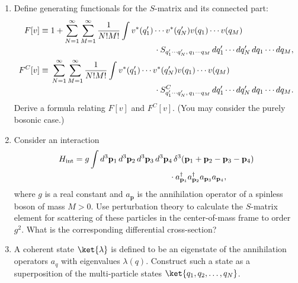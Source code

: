 

\begin{enumerate}
\item Define generating functionals for the $S$-matrix and its connected part:
\begin{align*}
  F[v] \equiv {}& 1
    + \sum_{N=1}^{\infty}\sum_{M=1}^{\infty}\frac{1}{N!M!}
      \int v^*(q'_1)\cdots v^*(q'_N)v(q_1)\cdots v(q_M)
      \\[-2pt]
    &\hspace{44mm}{}
      \cdot S_{q'_1\cdots q'_N,\,q_1\cdots q_M}
      \,dq'_1\cdots dq'_N\,dq_1\cdots dq_M, \\
  F^{C}[v] \equiv {}&
    \sum_{N=1}^{\infty}\sum_{M=1}^{\infty}\frac{1}{N!M!}
      \int v^*(q'_1)\cdots v^*(q'_N)v(q_1)\cdots v(q_M)
      \\[-2pt]
    &\hspace{44mm}{}
      \cdot S^{C}_{q'_1\cdots q'_N,\,q_1\cdots q_M}
      \,dq'_1\cdots dq'_N\,dq_1\cdots dq_M.
\end{align*}
Derive a formula relating $F[v]$ and $F^{C}[v]$. (You may consider the
purely bosonic case.)

\item Consider an interaction
\begin{align*}
  H_{\mathrm{int}} ={}& g\int d^3\mathbf{p}_1\,d^3\mathbf{p}_2\,
    d^3\mathbf{p}_3\,d^3\mathbf{p}_4\,
    \delta^3(\mathbf{p}_1+\mathbf{p}_2-\mathbf{p}_3-\mathbf{p}_4)
    \\
    &\hspace{36mm}{}
    \cdot a^{\dagger}_{\mathbf{p}_1} a^{\dagger}_{\mathbf{p}_2}
      a_{\mathbf{p}_3}a_{\mathbf{p}_4},
\end{align*}
where $g$ is a real constant and $a_{\mathbf{p}}$ is the annihilation operator
of a spinless boson of mass $M>0$. Use perturbation theory to calculate the
$S$-matrix element for scattering of these particles in the center-of-mass
frame to order $g^2$. What is the corresponding differential cross-section?

\item A coherent state $\ket{\lambda}$ is defined to be an eigenstate of the
annihilation operators $a_q$ with eigenvalues $\lambda(q)$. Construct such a
state as a superposition of the multi-particle states
$\ket{q_1,q_2,\ldots,q_N}$.
\end{enumerate}

